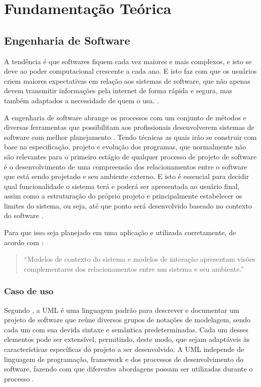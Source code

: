 \chapter{Fundamentação Teórica}\label{chp:LABEL_CHP_2}

\section{Engenharia de Software}
A tendência é que softwares fiquem cada vez maiores e mais complexos, e isto se deve ao poder computacional crescente a cada ano. E isto faz com que os usuários criem maiores expectativas em relação aos sistemas de software, que não apenas devem transmitir informações pela internet de forma rápida e segura, mas também adaptados a necessidade de quem o usa. \cite{SOMMERVILE}.

A engenharia de software abrange os processos com um conjunto de métodos e diversas ferramentas que possibilitam aos profissionais desenvolverem sistemas de software com melhor planejamento \cite{PRESSMAN}. Tendo técnicas as quais irão se construir com base na especificação, projeto e evolução dos programas, que normalmente não são relevantes para o primeiro estágio de qualquer processo de projeto de software é o desenvolvimento de uma compreensão dos relacionamentos entre o software que está sendo projetado e seu ambiente externo. E isto é essencial para decidir qual funcionalidade o sistema terá e poderá ser apresentada ao usuário final, assim como a estruturação do próprio projeto e principalmente estabelecer os limites do sistema, ou seja, até que ponto será desenvolvido baseado no contexto do software \cite{SOMMERVILE}.

Para que isso seja planejado em uma aplicação e utilizada corretamente, de acordo com \cite[p.126]{SOMMERVILE}: \begin{quote}
    “Modelos de contexto do sistema e modelos de interação apresentam visões complementares dos relacionamentos entre um sistema e seu ambiente.”
\end{quote} 
\subsection{Caso de uso}
Segundo , a UML é uma linguagem padrão para descrever e documentar um projeto de software que reúne diversos grupos de notações de modelagem, sendo cada um com sua devida sintaxe e semântica predeterminadas. Cada um desses elementos pode ser extensível, permitindo, deste modo, que sejam adaptáveis às características específicas do projeto a ser desenvolvido. A UML independe de linguagem de programação, framework e dos processos de desenvolvimento do software, fazendo com que diferentes abordagens possam ser utilizadas durante o processo \cite{BEZERRA}.

